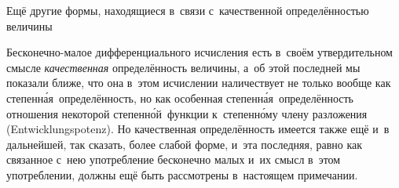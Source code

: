 \subsubremark%
{Ещё другие формы, находящиеся в~связи с~качественной
определённостью величины}

\label{bkm:bm53a}
Бесконечно-малое дифференциального исчисления есть в~своём утвердительном
смысле {\em качественная} определённость величины, а~об этой последней мы
показали ближе, что она в~этом исчислении наличествует не только вообще как
степенн\'{а}я~определённость, но как особенная степенн\'{а}я~определённость
отношения некоторой степенн\'{о}й~функции к~степенн\'{о}му члену разложения
(Ent\-wick\-lungs\-potenz). Но качественная
определённость имеется также ещё и~в дальнейшей, так сказать, более слабой
форме, и~эта последняя, равно как связанное с~нею употребление бесконечно малых
и~их смысл в~этом употреблении, должны ещё быть рассмотрены в~настоящем
примечании.

